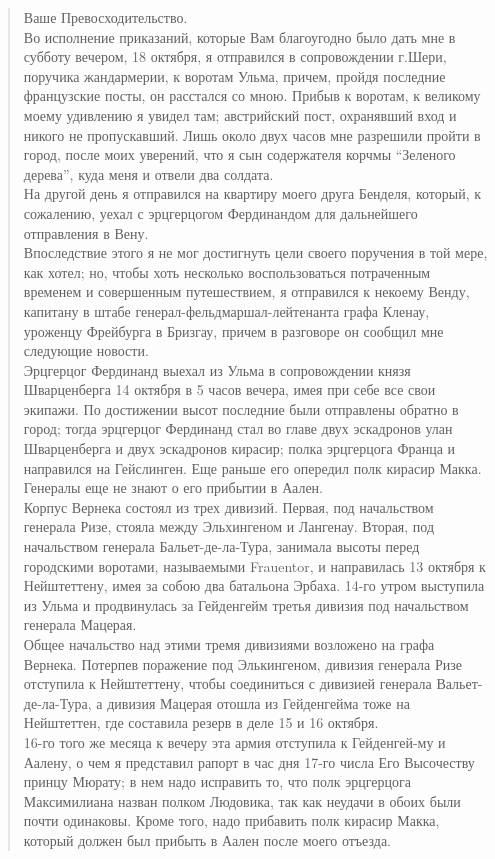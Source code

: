 \documentclass[
  oneside,
  12pt,
  titlepage]{book}
\begin{document}
\begin{quote}
Ваше Превосходительство.\\
Во исполнение приказаний, которые Вам благоугодно было дать мне в субботу вечером, 18 октября, я отправился в сопровождении г.Шери, поручика жандармерии, к воротам Ульма, причем, пройдя последние французские посты, он расстался со мною. Прибыв к воротам, к великому моему удивлению я увидел там; австрийский пост, охранявший вход и никого не пропускавший. Лишь около двух часов мне разрешили пройти в город, после моих уверений, что я сын содержателя корчмы ``Зеленого дерева'', куда меня и отвели два солдата.\\
На другой день я отправился на квартиру моего друга Бенделя, который, к сожалению, уехал с эрцгерцогом Фердинандом для дальнейшего отправления в Вену.\\
Впоследствие этого я не мог достигнуть цели своего поручения в той мере, как хотел; но, чтобы хоть несколько воспользоваться потраченным временем и совершенным путешествием, я отправился к некоему Венду, капитану в штабе генерал-фельдмаршал-лейтенанта графа Кленау, уроженцу Фрейбурга в Бризгау, причем в разговоре он сообщил мне следующие новости.\\
Эрцгерцог Фердинанд выехал из Ульма в сопровождении князя Шварценберга 14 октября в 5 часов вечера, имея при себе все свои экипажи. По достижении высот последние были отправлены обратно в город; тогда эрцгерцог Фердинанд стал во главе двух эскадронов улан Шварценберга и двух эскадронов кирасир; полка эрцгерцога Франца и направился на Гейслинген. Еще раньше его опередил полк кирасир Макка. Генералы еще не знают о его прибытии в Аален.\\
Корпус Вернека состоял из трех дивизий. Первая, под начальством генерала Ризе, стояла между Эльхингеном и Лангенау. Вторая, под начальством генерала Бальет-де-ла-Тура, занимала высоты перед городскими воротами, называемыми Frauentor, и направилась 13 октября к Нейштеттену, имея за собою два батальона Эрбаха. 14-го утром выступила из Ульма и продвинулась за Гейденгейм третья дивизия под начальством генерала Мацерая.\\
Общее начальство над этими тремя дивизиями возложено на графа Вернека. Потерпев поражение под Элькингеном, дивизия генерала Ризе отступила к Нейштеттену, чтобы соединиться с дивизией генерала Вальет-де-ла-Тура, а дивизия Мацерая отошла из Гейденгейма тоже на Нейштеттен, где составила резерв в деле 15 и 16 октября.\\
16-го того же месяца к вечеру эта армия отступила к Гейденгей-му и Аалену, о чем я представил рапорт в час дня 17-го числа Его Высочеству принцу Мюрату; в нем надо исправить то, что полк эрцгерцога Максимилиана назван полком Людовика, так как неудачи в обоих были почти одинаковы. Кроме того, надо прибавить полк кирасир Макка, который должен был прибыть в Аален после моего отъезда.\\

\end{quote}
\end{document}
